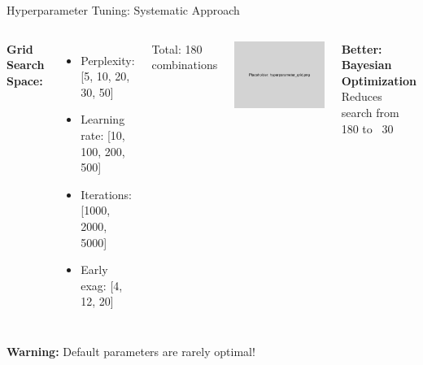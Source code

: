 \documentclass[aspectratio=169]{beamer}
\newcommand{\warning}[1]{\colorbox{red!10}{\textcolor{warningcolor}{\textbf{Warning:} #1}}}
\begin{document}
\begin{frame}{Hyperparameter Tuning: Systematic Approach}
\begin{columns}
\textbf{Grid Search Space:}
\begin{itemize}
\item Perplexity: [5, 10, 20, 30, 50]
\item Learning rate: [10, 100, 200, 500]
\item Iterations: [1000, 2000, 5000]
\item Early exag: [4, 12, 20]
\end{itemize}

Total: 180 combinations

\includegraphics[width=\textwidth]{./Figures/hyperparameter_grid.png}

\textbf{Better: Bayesian Optimization}\\
Reduces search from 180 to ~30
\end{columns}

\warning{Default parameters are rarely optimal!}
\end{frame}
\end{document}
